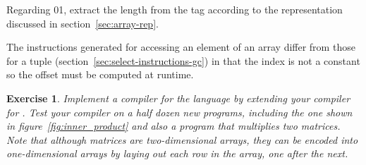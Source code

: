 \documentclass[7x10]{TimesAPriori_MIT}%
\def\racketEd{0}
\def\pythonEd{1}
\def\edition{0}
\newcommand{\racket}[1]{{\if\edition\racketEd{#1}\fi}}
\newcommand{\python}[1]{{\if\edition\pythonEd #1\fi}}
\newtheorem{exercise}[theorem]{Exercise}
\numberwithin{theorem}{chapter}
\numberwithin{definition}{chapter}
\numberwithin{equation}{chapter}
\begin{document}
Regarding \racket{}\python{},
extract the length from the tag according to the representation discussed in
section~\ref{sec:array-rep}.

The instructions generated for accessing an element of an array differ
from those for a tuple (section~\ref{sec:select-instructions-gc}) in
that the index is not a constant so the offset must be computed at
runtime.



\begin{exercise}\normalfont\normalsize

Implement a compiler for the \LangArray{} language by extending your
compiler for \LangLoop{}. Test your compiler on a half dozen new
programs, including the one shown in figure~\ref{fig:inner_product}
and also a program that multiplies two matrices. Note that although
matrices are two-dimensional arrays, they can be encoded into
one-dimensional arrays by laying out each row in the array, one after
the next.
  
\end{exercise}
\end{document}
